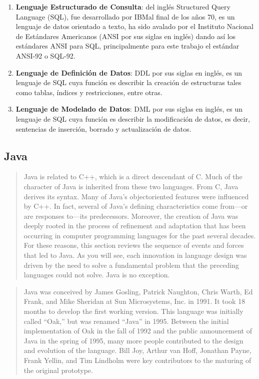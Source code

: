 \begin{enumerate}
	\item \textbf{Lenguaje Estructurado de Consulta}\label{sec-sql}: del inglés Structured Query Language (SQL), fue desarrollado por IBM\textcopyright al final de los años 70, es un lenguaje de datos orientado a texto, ha sido avalado por el Instituto Nacional de Estándares Americanos (ANSI por sus siglas en inglés) dando así los estándares ANSI para SQL, principalmente para este trabajo el estándar ANSI-92 o SQL-92.
	\item \textbf{Lenguaje de Definición de Datos}: DDL por sus siglas en inglés, es un lenguaje de SQL cuya función es describir la creación de estructuras tales como tablas, índices y restricciones, entre otras\cite{DataBaseConcepts}.
	\item \textbf{Lenguaje de Modelado de Datos}: DML por sus siglas en inglés, es un lenguaje de SQL cuya función es describir la modificación de datos, es decir, sentencias de inserción, borrado y actualización de datos\cite{DataBaseConcepts}.  
\end{enumerate}

\iffalse
\subsection{Java}

\begin{quote}
	Java is related to C++, which is a direct descendant of C. Much of the character of Java is inherited from these two languages. From C, Java derives its syntax. Many of Java’s objectoriented features were influenced by C++. In fact, several of Java’s defining characteristics come from—or are responses to—its predecessors. Moreover, the creation of Java was deeply rooted in the process of refinement and adaptation that has been occurring in computer programming languages for the past several decades. For these reasons, this section reviews the sequence of events and forces that led to Java. As you will see, each innovation in language design was driven by the need to solve a fundamental problem that the preceding languages could not solve. Java is no exception\cite{JavaCompleteReference}.
\end{quote}

\begin{quote}
	Java was conceived by James Gosling, Patrick Naughton, Chris Warth, Ed Frank, and Mike Sheridan at Sun Microsystems, Inc. in 1991. It took 18 months to develop the first working version. This language was initially called “Oak,” but was renamed “Java” in 1995. Between the initial implementation of Oak in the fall of 1992 and the public announcement of Java in the spring of 1995, many more people contributed to the design and evolution of the language. Bill Joy, Arthur van Hoff, Jonathan Payne, Frank Yellin, and Tim Lindholm were key contributors to the maturing of the original prototype\cite{JavaCompleteReference}.
\end{quote}


